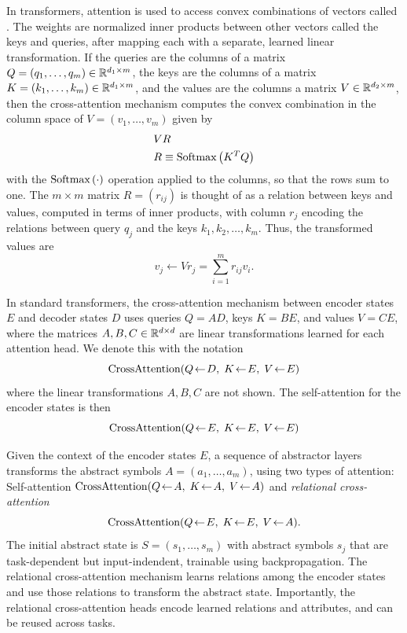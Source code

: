In transformers, attention is used to access convex combinations of vectors called . The weights are normalized inner products between other vectors called the keys and queries, after mapping each with a separate, learned linear transformation. If the queries are the columns of a matrix $Q = (q_1,\ldots, q_m)\in\mathbb{R}^{d_1\times m}$, the keys are the columns of a matrix $K = (k_1, \ldots, k_m)\in\mathbb{R}^{d_1\times m}$, and the values are the columns a matrix $V\in\mathbb{R}^{d_2\times m}$, then the cross-attention mechanism computes the convex combination in the column space of $V = (v_1, \ldots, v_m)$ given by 
\begin{align*}
    & V R  \\
    & R \equiv \softmax{K^T Q}
\end{align*}
with  the $\mbox{Softmax}\left(\cdot\right)$ operation applied to the columns, so that the rows sum to one. The $m\times m$ matrix $R = (r_{ij})$ is thought of 
as a relation between keys and values, computed in terms of inner products, with column $r_j$ 
encoding the relations between query $q_j$ and the keys $k_1, k_2, \ldots, k_m$. Thus, the transformed 
values are 
\begin{equation*}
    v_j \leftarrow V r_j = \sum_{i=1}^m r_{ij} v_i .
\end{equation*}

In standard transformers, the cross-attention mechanism between encoder states $E$ and decoder states $D$
uses queries $Q = AD$, keys $K = BE$, and values $V = CE$, where the matrices $A,B,C \in\mathbb{R}^{d\times d}$ are 
linear transformations learned for each attention head.  We denote this with the notation 
\begin{equation*}
     \qkv{D}{E}{E}
\end{equation*}
where the linear transformations $A, B, C$ are not shown. The self-attention for the encoder 
states is then
\begin{equation*}
    \qkv{E}{E}{E}
\end{equation*}

Given the context of the encoder states $E$, a sequence of abstractor layers transforms the abstract symbols $A = (a_1,\ldots, a_m)$, using two types of attention: Self-attention $\mbox{CrossAttention}(Q\!\leftarrow\!A,\; K\!\leftarrow\!A,\; V\!\leftarrow\!A)$ and 
\textit{relational cross-attention} 
\begin{equation*}
    \qkv{E}{E}{A}.
\end{equation*} 
The initial abstract state is $S = (s_1,\ldots, s_m)$ 
with abstract symbols $s_j$ that are task-dependent but input-indendent, trainable using 
backpropagation. The relational cross-attention mechanism learns relations among the encoder states and use those relations to transform the abstract state. Importantly, the relational cross-attention heads 
encode learned relations and attributes, and can be reused across tasks.


